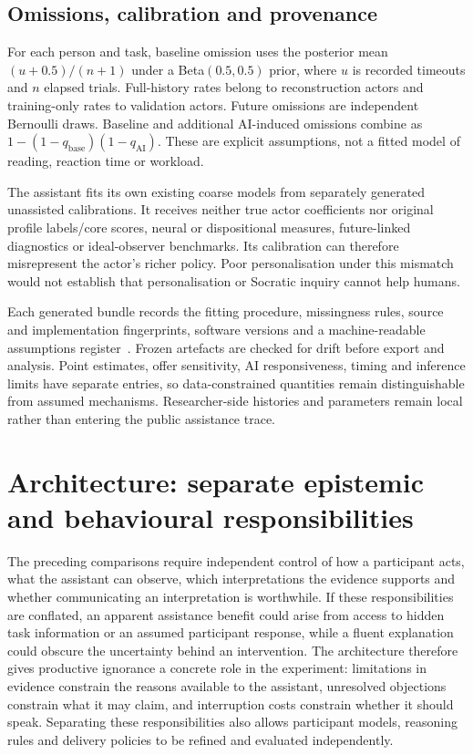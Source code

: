 \documentclass[11pt,a4paper]{article}
\begin{document}
\subsection{Omissions, calibration and provenance}
For each person and task, baseline omission uses the posterior mean $(u+0.5)/(n+1)$ under a Beta$(0.5,0.5)$ prior, where $u$ is recorded timeouts and $n$ elapsed trials. Full-history rates belong to reconstruction actors and training-only rates to validation actors. Future omissions are independent Bernoulli draws. Baseline and additional AI-induced omissions combine as $1-(1-q_{\mathrm{base}})(1-q_{\mathrm{AI}})$. These are explicit assumptions, not a fitted model of reading, reaction time or workload.

The assistant fits its own existing coarse models from separately generated unassisted calibrations. It receives neither true actor coefficients nor original profile labels/core scores, neural or dispositional measures, future-linked diagnostics or ideal-observer benchmarks. Its calibration can therefore misrepresent the actor's richer policy. Poor personalisation under this mismatch would not establish that personalisation or Socratic inquiry cannot help humans.

Each generated bundle records the fitting procedure, missingness rules, source and implementation fingerprints, software versions and a machine-readable assumptions register~\cite{pipeline}. Frozen artefacts are checked for drift before export and analysis. Point estimates, offer sensitivity, AI responsiveness, timing and inference limits have separate entries, so data-constrained quantities remain distinguishable from assumed mechanisms. Researcher-side histories and parameters remain local rather than entering the public assistance trace.

\section{Architecture: separate epistemic and behavioural responsibilities}
The preceding comparisons require independent control of how a participant acts, what the assistant can observe, which interpretations the evidence supports and whether communicating an interpretation is worthwhile. If these responsibilities are conflated, an apparent assistance benefit could arise from access to hidden task information or an assumed participant response, while a fluent explanation could obscure the uncertainty behind an intervention. The architecture therefore gives productive ignorance a concrete role in the experiment: limitations in evidence constrain the reasons available to the assistant, unresolved objections constrain what it may claim, and interruption costs constrain whether it should speak. Separating these responsibilities also allows participant models, reasoning rules and delivery policies to be refined and evaluated independently.
\end{document}
